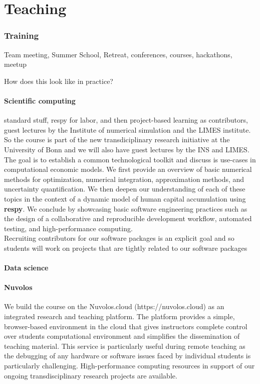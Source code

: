\section{Teaching}

\subsubsection*{Training} Team meeting, Summer School, Retreat, conferences, courses, hackathons, meetup


How does this look like in practice?

\paragraph{Scientific computing} standard stuff, respy for labor, and then project-based learning as contributors, guest lectures by the Institute of numerical simulation and the LIMES institute. So the course is part of the new transdiciplinary research initiative at the University of Bonn and we will also have guest lectures by the INS and LIMES. The goal is to establish a common technological toolkit and discuss is use-cases in computational economic models. We first provide an overview of basic numerical methods for optimization, numerical integration, approximation methods, and uncertainty quantification. We then deepen our understanding of each of these topics in the context of a dynamic model of human capital accumulation using \textbf{respy}. We conclude by showcasing basic software engineering practices such as the design of a collaborative and reproducible development workflow, automated testing, and high-performance computing.\\

\noindent Recruiting contributors for our software packages is an explicit goal and so students will work on projects that are tightly related to our software packages

\paragraph{Data science}

\paragraph{Nuvolos} We build the course on the Nuvolos.cloud (https://nuvolos.cloud) as an integrated research and teaching platform. The platform provides a simple, browser-based environment in the cloud that gives instructors complete control over students computational environment and simplifies the dissemination of teaching material. This service is particularly useful during remote teaching as the debugging of any hardware or software issues faced by individual students is particularly challenging. High-performance computing resources in support of our ongoing transdisciplinary research projects are available.
